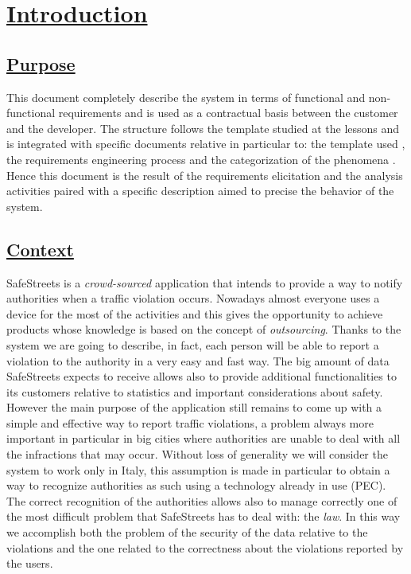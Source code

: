 \section[Introduction]{\hyperlink{toc}{Introduction}}
\label{sec:introduction}
\subsection[Purpose]{\hyperlink{toc}{Purpose}}
	\label{sec:purpose}
	This document completely describe the system in terms of functional and non-functional requirements and is used as a contractual basis between the customer and the developer. The structure follows the template studied at the lessons and is integrated with specific documents relative in particular to: the template used \cite{IEEErasd}, the requirements engineering process \cite{IEEEre} and the categorization of the phenomena \cite{W&M}. Hence this document is the result of the requirements elicitation and the analysis activities paired with a specific description aimed to precise the behavior of the system.
	
\subsection[Context]{\hyperlink{toc}{Context}}
	SafeStreets is a \emph{crowd-sourced} application that intends to provide a way to notify authorities when a traffic violation occurs. Nowadays almost everyone uses a device for the most of the activities and this gives the opportunity to achieve products whose knowledge is based on the concept of \emph{outsourcing}. Thanks to the system we are going to describe, in fact, each person will be able to report a violation to the authority in a very easy and fast way. The big amount of data SafeStreets expects to receive allows also to provide additional functionalities to its customers relative to statistics and important considerations about safety. However the main purpose of the application still remains to come up with a simple and effective way to report traffic violations, a problem always more important in particular in big cities where authorities are unable to deal with all the infractions that may occur. Without loss of generality we will consider the system to work only in Italy, this assumption is made in particular to obtain a way to recognize authorities as such using a technology already in use (PEC). The correct recognition of the authorities allows also to manage correctly one of the most difficult problem that SafeStreets has to deal with: the \emph{law}. In this way we accomplish both the problem of the security of the data relative to the violations and the one related to the correctness about the violations reported by the users.
	
